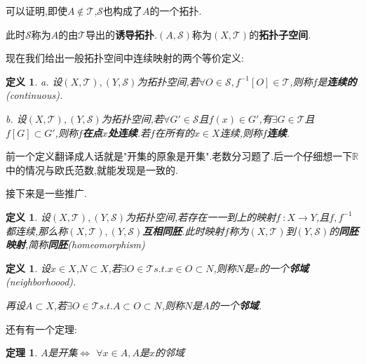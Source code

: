 \documentclass[UTF8]{article}
\begin{document}
	可以证明,即使$A\notin\mathscr{T}$,$\mathscr{S}$也构成了$A$的一个拓扑.
	
	此时$\mathscr{S}$称为$A$的由$\mathscr{T}$导出的\textbf{诱导拓扑}.$(A,\mathscr{S})$称为$(X,\mathscr{T})$的\textbf{拓扑子空间}.
	
	现在我们给出一般拓扑空间中连续映射的两个等价定义:
	
	\newtheorem*{continuous}{定义}
	
	\begin{continuous}
		
		a. 设$(X,\mathscr{T}),(Y,\mathscr{S})$为拓扑空间,若$\forall O \in \mathscr{S}, f^{-1}[O] \in \mathscr{T}$,则称$f$是\textbf{连续的}(continuous).
		
		b. 设$(X,\mathscr{T}),(Y,\mathscr{S})$为拓扑空间,若$\forall G' \in \mathscr{S}$且$f(x) \in G'$,有$\exists G \in \mathscr{T}$且$f[G] \subset G'$,则称$f$\textbf{在点$x$处连续}.若$f$在所有的$x \in X$连续,则称$f$\textbf{连续}.
		
	\end{continuous}
	
	前一个定义翻译成人话就是"开集的原象是开集".老数分习题了.后一个仔细想一下$\mathbb{R}$中的情况与欧氏范数,就能发现是一致的.
	
	接下来是一些推广.
	
	\newtheorem*{homeomorphic}{定义}
	
	\begin{homeomorphic}
		设$(X,\mathscr{T}),(Y,\mathscr{S})$为拓扑空间,若存在一一到上的映射$f~:X \to Y$,且$f,f^{-1}$都连续,那么称$(X,\mathscr{T}),(Y,\mathscr{S})$\textbf{互相同胚}.此时映射$f$称为$(X,\mathscr{T})$到$(Y,\mathscr{S})$的\textbf{同胚映射},简称\textbf{同胚}(homeomorphism)
	\end{homeomorphic}
	
	\newtheorem*{neighborhood}{定义}
	
	\begin{neighborhood}
		
		设$x \in X$,$N \subset X$,若$\exists O \in \mathscr{T} s.t. x \in O \subset N$,则称$N$是$x$的一个\textbf{邻域}(neighborhoood).
		
		再设$A \subset X$,若$\exists O \in \mathscr{T} s.t. A \subset O \subset N$,则称$N$是$A$的一个\textbf{邻域}.
		
	\end{neighborhood}
	
	还有有一个定理:
	
	\newtheorem*{neighborhoodEquivalence}{定理}
	
	\begin{neighborhoodEquivalence}
		$A$是开集$\Leftrightarrow$ $\forall x \in A, A$是$x$的邻域
	\end{neighborhoodEquivalence}
	
\end{document}
